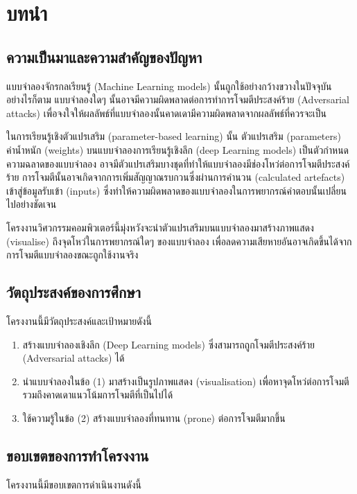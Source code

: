 \documentclass{cpereport}
\begin{document}
\chapter{บทนำ}

\section{ความเป็นมาและความสําคัญของปัญหา}

แบบจำลองจักรกลเรียนรู้ (Machine Learning models) นั้นถูกใช้อย่างกว้างขวางในปัจจุบัน อย่างไรก็ตาม แบบจำลองใดๆ นั้นอาจมีความผิดพลาดต่อการทำการโจมตีประสงค์ร้าย (Adversarial attacks) เพื่อจงใจให้ผลลัพธ์ที่แบบจำลองนั้นคาดเดามีความผิดพลาดจากผลลัพธ์ที่ควรจะเป็น

ในการเรียนรู้เชิงตัวแปรเสริม (parameter-based learning) นั้น ตัวแปรเสริม (parameters) ค่าน้ำหนัก (weights) บนแบบจำลองการเรียนรู้เชิงลึก (deep Learning models) เป็นตัวกำหนดความฉลาดของแบบจำลอง อาจมีตัวแปรเสริมบางชุดที่ทำให้แบบจำลองมีช่องโหว่ต่อการโจมตีประสงค์ร้าย การโจมตีนั้นอาจเกิดจากการเพิ่มสัญญาณรบกวนซึ่งผ่านการคำนวน (calculated artefacts) เข้าสู่ข้อมูลรับเข้า (inputs) ซึ่งทำให้ความผิดพลาดของแบบจำลองในการพยากรณ์คำตอบนั้นเปลี่ยนไปอย่างชัดเจน 

โครงงานวิศวกรรมคอมพิวเตอร์นี้มุ่งหวังจะนำตัวแปรเสริมบนแบบจำลองมาสร้างภาพแสดง (visualise) ถึงจุดโหว่ในการพยากรณ์ใดๆ ของแบบจำลอง เพื่อลดความเสียหายอันอาจเกิดขึ้นได้จากการโจมตีแบบจำลองขณะถูกใช้งานจริง

\section{วัตถุประสงค์ของการศึกษา}
\noindent
โครงงานนี้มีวัตถุประสงค์และเป้าหมายดังนี้

\begin{enumerate}
    \item สร้างแบบจำลองเชิงลึก (Deep Learning models) ซึ่งสามารถถูกโจมตีประสงค์ร้าย (Adversarial attacks) ได้
    \item นำแบบจำลองในข้อ (1) มาสร้างเป็นรูปภาพแสดง (visualisation) เพื่อหาจุดโหว่ต่อการโจมตี รวมถึงคาดเดาแนวโน้มการโจมตีที่เป็นไปได้
    \item ใช้ความรู้ในข้อ (2) สร้างแบบจำลองที่ทนทาน (prone) ต่อการโจมตีมากขึ้น
\end{enumerate}

\section{ขอบเขตของการทําโครงงาน}
\noindent
โครงงานนี้มีขอบเขตการดำเนินงานดังนี้
\end{document}
